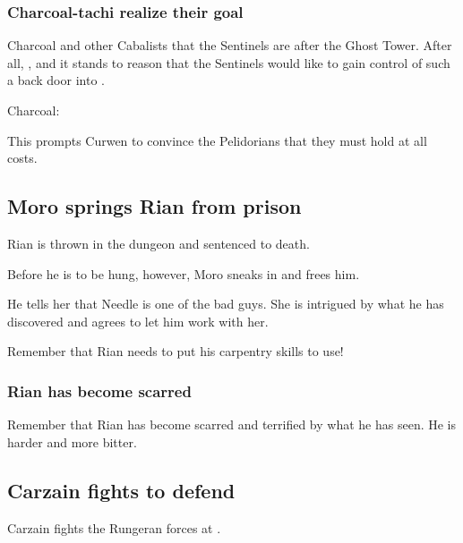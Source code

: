 \begin{garbage}
\subsubsection{Charcoal-tachi realize their goal}
Charcoal and other Cabalists  that the Sentinels are after the Ghost Tower. 
After all, , and it stands to reason that the Sentinels would like to gain control of such a back door into \Nyx. 

\begin{prose}
  Charcoal:
\end{prose}

This prompts Curwen to convince the Pelidorians that they must hold \Forklin{} at all costs. 









\subsection{Moro springs Rian from prison}
Rian is thrown in the dungeon and sentenced to death. 

Before he is to be hung, however, Moro \Cornel{} sneaks in and frees him. 

He tells her that Needle is one of the bad guys. 
She is intrigued by what he has discovered and agrees to let him work with her. 

Remember that Rian needs to put his carpentry skills to use! 





\subsubsection{Rian has become scarred}
Remember that Rian has become scarred and terrified by what he has seen. 
He is harder and more bitter. 







\subsection{Carzain fights to defend \Forklin}
Carzain fights the Rungeran forces at \Forklin. 


\end{garbage}
